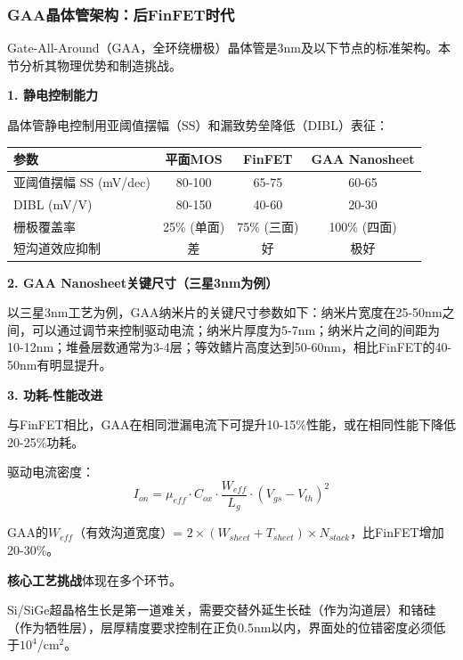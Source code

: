 \subsubsection{GAA晶体管架构：后FinFET时代}

Gate-All-Around（GAA，全环绕栅极）晶体管是3nm及以下节点的标准架构。本节分析其物理优势和制造挑战\cite{IEDM2024GAA, Samsung2024GAA, Intel2024RibbonFET}。

\textbf{1. 静电控制能力}

晶体管静电控制用亚阈值摆幅（SS）和漏致势垒降低（DIBL）表征：

\begin{table}[H]
\centering
\small
\begin{tabular}{lccc}
\toprule
\textbf{参数} & \textbf{平面MOS} & \textbf{FinFET} & \textbf{GAA Nanosheet} \\
\midrule
亚阈值摆幅 SS (mV/dec) & 80-100 & 65-75 & 60-65 \\
DIBL (mV/V) & 80-150 & 40-60 & 20-30 \\
栅极覆盖率 & 25\% (单面) & 75\% (三面) & 100\% (四面) \\
短沟道效应抑制 & 差 & 好 & 极好 \\
\bottomrule
\end{tabular}
\end{table}

\textbf{2. GAA Nanosheet关键尺寸（三星3nm为例）}

以三星3nm工艺为例，GAA纳米片的关键尺寸参数如下：纳米片宽度在25-50nm之间，可以通过调节来控制驱动电流；纳米片厚度为5-7nm；纳米片之间的间距为10-12nm；堆叠层数通常为3-4层；等效鳍片高度达到50-60nm，相比FinFET的40-50nm有明显提升。

\textbf{3. 功耗-性能改进}

与FinFET相比，GAA在相同泄漏电流下可提升10-15\%性能，或在相同性能下降低20-25\%功耗。

驱动电流密度：
\begin{equation}
I_{on} = \mu_{eff} \cdot C_{ox} \cdot \frac{W_{eff}}{L_g} \cdot (V_{gs} - V_{th})^2
\end{equation}

GAA的$W_{eff}$（有效沟道宽度）= $2 \times (W_{sheet} + T_{sheet}) \times N_{stack}$，比FinFET增加20-30\%。

\textbf{核心工艺挑战}体现在多个环节。

Si/SiGe超晶格生长是第一道难关，需要交替外延生长硅（作为沟道层）和锗硅（作为牺牲层），层厚精度要求控制在正负0.5nm以内，界面处的位错密度必须低于$10^4$/cm$^2$。

